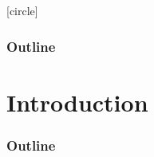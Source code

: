 \documentclass[10pt, aspectratio=169]{beamer}
\theoremstyle{remark}
\theoremstyle{definition}
\begin{document}
[circle]

\begin{frame}
	\frametitle{Outline} %
	\tableofcontents %
\end{frame}



\section{Introduction}

\begin{frame}
	\frametitle{Outline} %
	\tableofcontents[currentsection] %
\end{frame}
\end{document}
